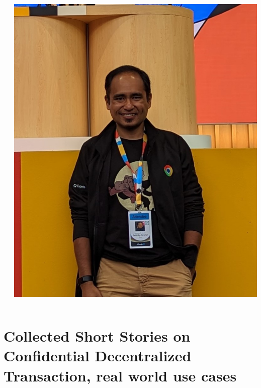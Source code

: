 \documentclass[10pt,aspectratio=169]{beamer}
\begin{document}
\begin{frame}
\begin{columns}
\begin{column}{0.7\textwidth}
\end{column}
\begin{column}{0.3\textwidth}
\includegraphics[width=\textwidth]{source/me}\\
\end{column}
\end{columns}
\end{frame}



\section{Collected Short Stories on Confidential Decentralized Transaction, real world use cases}
\end{document}
